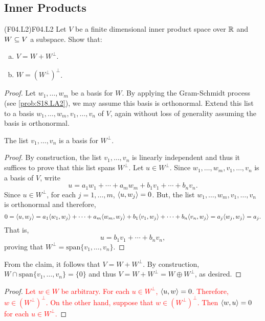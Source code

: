 \documentclass[../AlgebraQualSolutions.tex]{subfiles}
\begin{document}
\subsection{Inner Products}

\begin{prob}{(F04.L2)}{F04.L2}
    Let $V$ be a finite dimensional inner product space over $\mathbb{R}$ and $W \subseteq V$ a subspace. Show that:

    \begin{enumerate}[(a)]
        \item $V = W + W^\perp$.
        \item $W = (W^\perp)^\perp$.
    \end{enumerate}
\end{prob}

\begin{proof}
    Let $w_1,\ldots, w_m$ be a basis for $W$. By applying the Gram-Schmidt process (see \ref{prob:S18.LA2}), we may assume this basis is orthonormal. Extend this list to a basis $w_1,\ldots, w_m, v_1, \ldots, v_n$ of $V$, again without loss of generality assuming the basis is orthonormal.

    \begin{claim}
        The list $v_1, \ldots, v_n$ is a basis for $W^\perp$. 

        \begin{proof}
            By construction, the list $v_1, \ldots, v_n$ is linearly independent and thus it suffices to prove that this list spans $W^\perp$. Let $u \in W^\perp$. Since $w_1,\ldots, w_m, v_1, \ldots, v_n$ is a basis of $V$, write
                \[u = a_1w_1 + \cdots + a_m w_m  + b_1v_1 + \cdots + b_n v_n.\]
            Since $u \in W^\perp$, for each $j = 1,\ldots, m$, $\langle u, w_j\rangle = 0$. But, the list $w_1,\ldots, w_m, v_1, \ldots, v_n$ is orthonormal and therefore,
                \[0 = \langle u, w_j\rangle = a_1 \langle w_1, w_j\rangle + \cdots + a_m \langle w_m, w_j\rangle + b_1 \langle v_1, w_j\rangle + \cdots + b_n \langle v_n, w_j\rangle = a_j\langle w_j, w_j\rangle = a_j.\]
            That is,
                \[u = b_1v_1 + \cdots + b_n v_n,\]
            proving that $W^\perp = \textrm{span}\{v_1, \ldots, v_n\}$.
        \end{proof}
    \end{claim}
    From the claim, it follows that $V = W + W^\perp$. By construction, $W \cap \textrm{span}\{v_1, \ldots, v_n\} = \{0\}$ and thus $V = W + W^\perp = W \oplus W^\perp$, as desired.
\end{proof}

\begin{proof}
    \textcolor{red}{Let $w \in W$ be arbitrary. For each $u \in W^\perp$, $\langle u, w\rangle = 0$. Therefore, $w \in (W^\perp)^\perp$. On the other hand, suppose that $w \in (W^\perp)^\perp$. Then $\langle w, u\rangle = 0$ for each $u \in W^\perp$.}
\end{proof}
\end{document}
